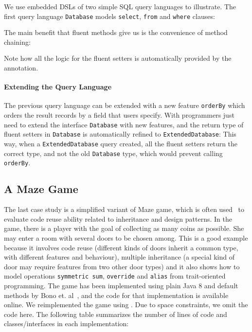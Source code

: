 \noindent We use embedded DSLs of two simple SQL query languages to illustrate.
The first query language \texttt{Database}  models
\texttt{select}, \texttt{from} and \texttt{where} clauses:

\noindent The main benefit that fluent methods give
us is the convenience of method chaining:


\noindent Note how all the logic for the fluent setters is automatically provided by the \mixin annotation. 

\paragraph{Extending the Query Language} The previous query language can be extended with a new feature
\texttt{orderBy} which orders the result records by a field that users
specify. With \mixin programmers just need to extend the interface \texttt{Database} with new
features, and the return type of fluent setters in
\texttt{Database} is automatically refined to \texttt{ExtendedDatabase}:
This way, when a \texttt{ExtendedDatabase} query created, 
all the fluent setters return the correct type, and not the old \texttt{Database} type, which would prevent calling 
\texttt{orderBy}.


\subsection{A Maze Game}
The last case study is a simplified variant of Maze game, which is often
used~\cite{gof,bono14} 
to evaluate code reuse ability related to inheritance and design
patterns. In the game, there is a player with the goal of collecting
as many coins as possible. She may enter a room with several doors to
be chosen among. This is a good example because it involves code reuse
(different kinds of doors inherit a common type, with different
features and behaviour), multiple inheritance (a special kind of door
may require features from two other door types) and it also shows how
to model operations \texttt{symmetric sum}, \texttt{override} and
\texttt{alias} from trait-oriented programming. The game has been
implemented using plain Java 8 and default methods by Bono
et. al~\cite{bono14}, and the code for that implementation is
available online. We reimplemented the game using \mixin. Due to space
constraints, we omit the code here. The following table summarizes
the number of lines of code and classes/interfaces in each implementation:

